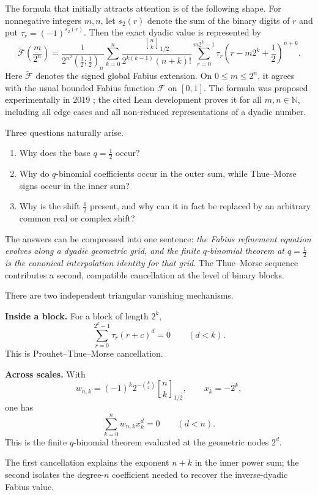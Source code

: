 \documentclass[11pt,oneside]{article}
\theoremstyle{definition}
\theoremstyle{remark}
\newcommand{\qpoch}[3]{\left(#1;#2\right)_{#3}}
\newcommand{\halfqbinom}[2]{{\genfrac{[}{]}{0pt}{}{#1}{#2}}_{1/2}}
\newcommand{\F}{\mathcal F}
\newcommand{\G}{\widetilde{\mathcal F}}
\newcommand{\N}{\mathbb N}
\newcommand{\tm}{\tau}
\begin{document}
The formula that initially attracts attention is of the following shape.  For nonnegative integers $m,n$, let $s_2(r)$ denote the sum of the binary digits of $r$ and put $\tm_r=(-1)^{s_2(r)}$.  Then the exact dyadic value is represented by
\begin{equation}\label{eq:headline}
\boxed{
\G\!\left(\frac{m}{2^n}\right)
=
\frac{1}{2^{n^2}\qpoch{\frac12}{\frac12}{n}}
\sum_{k=0}^{n}
\frac{\halfqbinom{n}{k}}
     {2^{k(k-1)}(n+k)!}
\sum_{r=0}^{m2^k-1}
\tm_r\left(r-m2^k+\frac12\right)^{n+k}.}
\end{equation}
Here $\G$ denotes the signed global Fabius extension.  On $0\le m\le 2^n$, it agrees with the usual bounded Fabius function $\F$ on $[0,1]$.  The formula was proposed experimentally in 2019 \cite{ReshetnikovMSE}; the cited Lean development proves it for all $m,n\in\N$, including all edge cases and all non-reduced representations of a dyadic number.

Three questions naturally arise.

\begin{enumerate}[label=\textbf{Q\arabic*.},leftmargin=3.2em]
\item Why does the base $q=\tfrac12$ occur?
\item Why do $q$-binomial coefficients occur in the outer sum, while Thue--Morse signs occur in the inner sum?
\item Why is the shift $\tfrac12$ present, and why can it in fact be replaced by an arbitrary common real or complex shift?
\end{enumerate}

The answers can be compressed into one sentence: \emph{the Fabius refinement equation evolves along a dyadic geometric grid, and the finite $q$-binomial theorem at $q=\tfrac12$ is the canonical interpolation identity for that grid}.  The Thue--Morse sequence contributes a second, compatible cancellation at the level of binary blocks.

\begin{keybox}
There are two independent triangular vanishing mechanisms.

\medskip
\noindent\textbf{Inside a block.} For a block of length $2^k$,
\[
  \sum_{r=0}^{2^k-1}\tm_r(r+c)^d=0\qquad(d<k).
\]
This is Prouhet--Thue--Morse cancellation.

\medskip
\noindent\textbf{Across scales.} With
\[
 w_{n,k}=(-1)^k2^{-\binom{k}{2}}\halfqbinom{n}{k},
 \qquad x_k=-2^k,
\]
one has
\[
  \sum_{k=0}^{n}w_{n,k}x_k^d=0\qquad(d<n).
\]
This is the finite $q$-binomial theorem evaluated at the geometric nodes $2^d$.

\medskip
The first cancellation explains the exponent $n+k$ in the inner power sum; the second isolates the degree-$n$ coefficient needed to recover the inverse-dyadic Fabius value.
\end{keybox}
\end{document}

